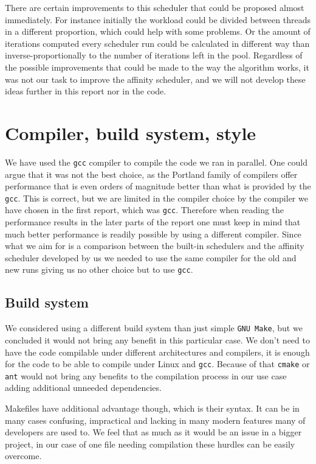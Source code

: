 \documentclass[11pt,a4paper]{article}
\begin{document}
There are certain improvements to this scheduler that could be proposed almost immediately. For instance initially the workload could be divided between threads in a different proportion, which could help with some problems. 
Or the amount of iterations computed every scheduler run could be calculated in different way than inverse-proportionally to the number of iterations left in the pool.
Regardless of the possible improvements that could be made to the way the algorithm works, it was not our task to improve the affinity scheduler, and we will not develop these ideas further in this report nor in the code.

\section{Compiler, build system, style}
We have used the \texttt{gcc} compiler to compile the code we ran in parallel.
One could argue that it was not the best choice, as the Portland family of compilers offer performance that is even orders of magnitude better than what is provided by the \texttt{gcc}. 
This is correct, but we are limited in the compiler choice by the compiler we have chosen in the first report, which was \texttt{gcc}. 
Therefore when reading the performance results in the later parts of the report one must keep in mind that much better performance is readily possible by using a different compiler. 
Since what we aim for is a comparison between the built-in schedulers and the affinity scheduler developed by us we needed to use the same compiler for the old and new runs giving us no other choice but to use \texttt{gcc}.

\subsection{Build system}
We considered using a different build system than just simple \texttt{GNU Make}, but we concluded it would not bring any benefit in this particular case. 
We don't need to have the code compilable under different architectures and compilers, it is enough for the code to be able to compile under Linux and \texttt{gcc}. 
Because of that \texttt{cmake} or \texttt{ant} would not bring any benefits to the compilation process in our use case adding additional unneeded dependencies. 

Makefiles have additional advantage though, which is their syntax. 
It can be in many cases confusing, impractical and lacking in many modern features many of developers are used to.
We feel that as much as it would be an issue in a bigger project, in our case of one file needing compilation these hurdles can be easily overcome.
\end{document}
